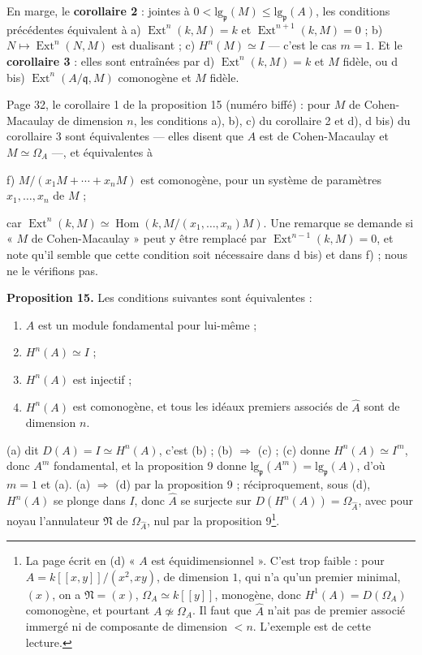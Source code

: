 \documentclass[11pt,a4paper]{article}
\begin{document}
En marge, le \textbf{corollaire 2} : jointes à $0 <
\mathrm{lg}_{\mathfrak{p}}(M) \leqslant \mathrm{lg}_{\mathfrak{p}}(A)$, les
conditions précédentes équivalent à a) $\operatorname{Ext}^n(k, M) = k$ et
$\operatorname{Ext}^{n+1}(k, M) = 0$ ; b) $N \mapsto \operatorname{Ext}^n(N, M)$
est dualisant ; c) $H^n(M) \simeq I$ --- c'est le cas $m = 1$. Et le
\textbf{corollaire 3} : elles sont entraînées par d) $\operatorname{Ext}^n(k, M)
= k$ et $M$ fidèle, ou d bis) $\operatorname{Ext}^n(A/\mathfrak{q}, M)$
comonogène et $M$ fidèle.

Page 32, le corollaire 1 de la proposition 15 (numéro biffé) : pour $M$ de
Cohen-Macaulay de dimension $n$, les conditions a), b), c) du corollaire 2 et
d), d bis) du corollaire 3 sont équivalentes --- elles disent que $A$ est de
Cohen-Macaulay et $M \simeq \Omega_A$ ---, et équivalentes à

f) $M/(x_1M + \cdots + x_nM)$ est comonogène, pour un système de paramètres
$x_1, \ldots, x_n$ de $M$ ;

car $\operatorname{Ext}^n(k, M) \simeq \operatorname{Hom}(k, M/(x_1, \ldots,
x_n)M)$. Une remarque se demande si « $M$ de Cohen-Macaulay » peut y être
remplacé par $\operatorname{Ext}^{n-1}(k, M) = 0$, et note qu'il semble que
cette condition soit nécessaire dans d bis) et dans f) ; nous ne le vérifions
pas.

\textbf{Proposition 15.} Les conditions suivantes sont équivalentes :
\begin{enumerate}
\item[(a)] $A$ est un module fondamental pour lui-même ;
\item[(b)] $H^n(A) \simeq I$ ;
\item[(c)] $H^n(A)$ est injectif ;
\item[(d)] $H^n(A)$ est comonogène, et tous les idéaux premiers associés de
$\widehat{A}$ sont de dimension $n$.
\end{enumerate}
(a) dit $D(A) = I \simeq H^n(A)$, c'est (b) ; (b) $\Rightarrow$ (c) ; (c)
donne $H^n(A) \simeq I^m$, donc $A^m$ fondamental, et la proposition 9 donne
$\mathrm{lg}_{\mathfrak{p}}(A^m) = \mathrm{lg}_{\mathfrak{p}}(A)$, d'où $m = 1$
et (a). (a) $\Rightarrow$ (d) par la proposition 9 ; réciproquement, sous (d),
$H^n(A)$ se plonge dans $I$, donc $\widehat{A}$ se surjecte sur
$D(H^n(A)) = \Omega_{\widehat{A}}$, avec pour noyau l'annulateur
$\mathfrak{N}$ de $\Omega_{\widehat{A}}$, nul par la proposition 9\footnote{La
page écrit en (d) « $A$ est équidimensionnel ». C'est trop faible : pour $A =
k[[x,y]]/(x^2, xy)$, de dimension $1$, qui n'a qu'un premier minimal, $(x)$,
on a $\mathfrak{N} = (x)$, $\Omega_A \simeq k[[y]]$, monogène, donc $H^1(A) =
D(\Omega_A)$ comonogène, et pourtant $A \not\simeq \Omega_A$. Il faut que
$\widehat{A}$ n'ait pas de premier associé immergé ni de composante de
dimension $< n$. L'exemple est de cette lecture.}.
\end{document}
